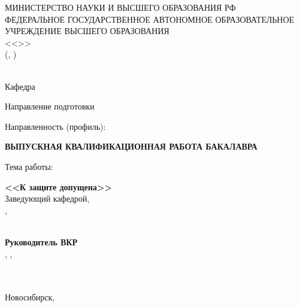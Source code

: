 \begin{titlepage}
\newpage
\setlength{\baselineskip}{5mm}

\begin{center}
	МИНИСТЕРСТВО НАУКИ И ВЫСШЕГО ОБРАЗОВАНИЯ РФ \\
	ФЕДЕРАЛЬНОЕ ГОСУДАРСТВЕННОЕ АВТОНОМНОЕ ОБРАЗОВАТЕЛЬНОЕ УЧРЕЖДЕНИЕ ВЫСШЕГО ОБРАЗОВАНИЯ \\
	\hspace{-0.5mm}<<\MakeUppercase{\universitylongsplit}>> \\
	(\MakeUppercase{\university}, \universityshort)
\end{center}

\begin{center}
    \faculty \\
    Кафедра \uline{\makebox[6cm][l]{\department}}
\end{center}

Направление подготовки \programnum\thinspace{\programname}

Направленность (профиль):  \thinspace{\specialization}
\vspace{1.53cm} %

\begin{center}
    \hspace{7mm}\textbf{ВЫПУСКНАЯ КВАЛИФИКАЦИОННАЯ РАБОТА БАКАЛАВРА} \\
    \textbf{\student}
\end{center}

Тема работы:

\begin{center}
    \MakeUppercase{\textbf{\topic}}
    \vspace{1.02cm} %
\end{center}


\begin{minipage}[b]{0.35\textwidth}
    \textbf{<<К защите допущена>>} \\
    Заведующий кафедрой, \\
    \apdegree, \aprank \\
    \infotemplate \\
    \datetemplate
\end{minipage}
\hspace{20mm}
\begin{minipage}[b]{0.35\textwidth}
    \textbf{Руководитель ВКР} \\
    \sadegree, \sarank, \\
    \sansutitle \\
    \infotemplate \\
    \datetemplate
\end{minipage}

\begin{center}  
    \vfill
    Новосибирск, \currentyear[\uline]
\end{center}

\end{titlepage}